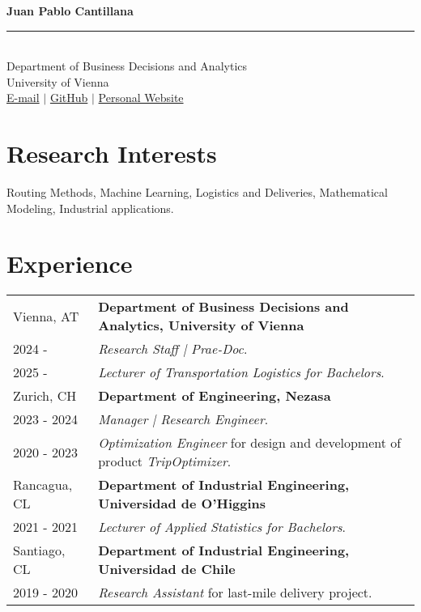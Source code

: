 \documentclass[10pt, a4paper]{article}
\begin{document}
\begin{center}
    {\LARGE \textbf{Juan Pablo Cantillana}} \\[0.2cm]
    \rule{\textwidth}{0.4pt} \\[0.2cm] %
    Department of Business Decisions and Analytics \\
    University of Vienna \\
    \href{mailto:juan.pablo.cantillana.abarca@univie.ac.at}{E-mail} $|$ 
    \href{https://github.com/jpCantillana}{GitHub} $|$
    \href{https://jpCantillana.github.io/page}{Personal Website}
\end{center}

\section*{Research Interests}
Routing Methods, Machine Learning, Logistics and Deliveries, Mathematical Modeling, Industrial applications.

\section*{Experience}

\noindent
\begin{tabular}{@{} p{} p{} @{}}
    Vienna, AT & \textbf{Department of Business Decisions and Analytics, University of Vienna} \\
    2024 -  & \textit{Research Staff | Prae-Doc}. \\
    2025 -  & \textit{Lecturer of Transportation Logistics for Bachelors}. \\
    Zurich, CH & \textbf{Department of Engineering, Nezasa} \\
    2023 - 2024 & \textit{Manager | Research Engineer}. \\
    2020 - 2023 & \textit{Optimization Engineer} for design and development of product \textit{TripOptimizer}.\\
    Rancagua, CL & \textbf{Department of Industrial Engineering, Universidad de O'Higgins} \\
    2021 - 2021 & \textit{Lecturer of Applied Statistics for Bachelors}. \\
    Santiago, CL & \textbf{Department of Industrial Engineering, Universidad de Chile} \\
    2019 - 2020 & \textit{Research Assistant} for last-mile delivery project.\\
\end{tabular}
\end{document}
